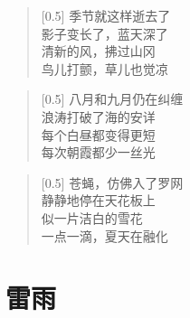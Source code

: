 \documentclass[12pt,UTF-8,openany]{ctexbook}
\begin{document}
\begin{normalsize}
    
    \begin{verse}[0.5\linewidth]
        季节就这样逝去了 \\
        影子变长了，蓝天深了 \\
        清新的风，拂过山冈 \\
        鸟儿打颤，草儿也觉凉
    \end{verse}
    
    
    \begin{verse}[0.5\linewidth]
        八月和九月仍在纠缠 \\
        浪涛打破了海的安详 \\
        每个白昼都变得更短 \\
        每次朝霞都少一丝光
    \end{verse}
    
    
    \begin{verse}[0.5\linewidth]
        苍蝇，仿佛入了罗网 \\
        静静地停在天花板上 \\
        似一片洁白的雪花 \\
        一点一滴，夏天在融化
    \end{verse}
    
\end{normalsize}



\chapter{雷雨}
\end{document}
